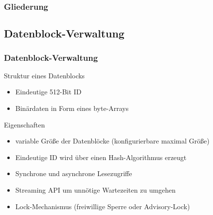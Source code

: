 \documentclass{beamer}
\begin{document}
	\begin{frame}
		\frametitle{Gliederung}

	\end{frame}

	\subsection{Datenblock-Verwaltung}

		\begin{frame}
			\frametitle{Datenblock-Verwaltung}

			\begin{block}{Struktur eines Datenblocks}
				\begin{itemize}
					\item Eindeutige 512-Bit ID
					\item Binärdaten in Form eines byte-Arrays
				\end{itemize}
			\end{block}

			\begin{block}{Eigenschaften}
				\begin{itemize}
					\item variable Größe der Datenblöcke (konfigurierbare maximal Größe)
					\item Eindeutige ID wird über einen Hash-Algorithmus erzeugt
					\item Synchrone und asynchrone Lesezugriffe
					\item Streaming API um unnötige Wartezeiten zu umgehen
					\item Lock-Mechanismus (freiwillige Sperre oder Advisory-Lock)
				\end{itemize}
			\end{block}
		\end{frame}
\end{document}

